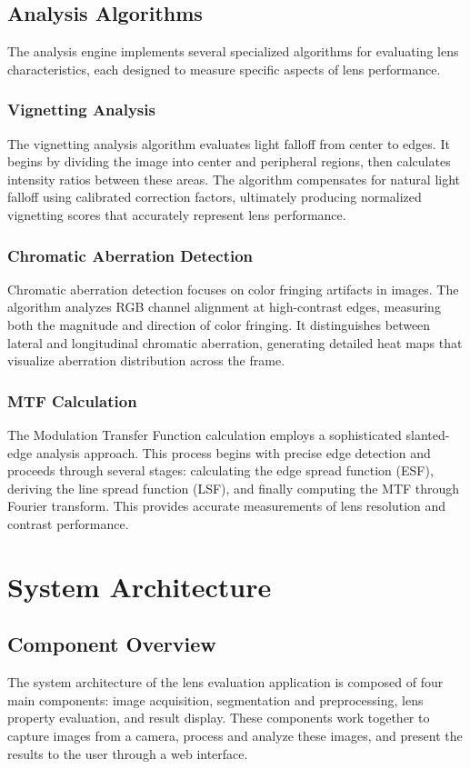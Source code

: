 \subsection{Analysis Algorithms}
The analysis engine implements several specialized algorithms for evaluating lens characteristics, each designed to measure specific aspects of lens performance.

\subsubsection{Vignetting Analysis}
The vignetting analysis algorithm evaluates light falloff from center to edges. It begins by dividing the image into center and peripheral regions, then calculates intensity ratios between these areas. The algorithm compensates for natural light falloff using calibrated correction factors, ultimately producing normalized vignetting scores that accurately represent lens performance.

\subsubsection{Chromatic Aberration Detection}
Chromatic aberration detection focuses on color fringing artifacts in images. The algorithm analyzes RGB channel alignment at high-contrast edges, measuring both the magnitude and direction of color fringing. It distinguishes between lateral and longitudinal chromatic aberration, generating detailed heat maps that visualize aberration distribution across the frame.

\subsubsection{MTF Calculation}
The Modulation Transfer Function calculation employs a sophisticated slanted-edge analysis approach. This process begins with precise edge detection and proceeds through several stages: calculating the edge spread function (ESF), deriving the line spread function (LSF), and finally computing the MTF through Fourier transform. This provides accurate measurements of lens resolution and contrast performance.


\section{System Architecture}

\subsection{Component Overview}
The system architecture of the lens evaluation application is composed of four main components: image acquisition, segmentation and preprocessing, lens property evaluation, and result display. These components work together to capture images from a camera, process and analyze these images, and present the results to the user through a web interface.

